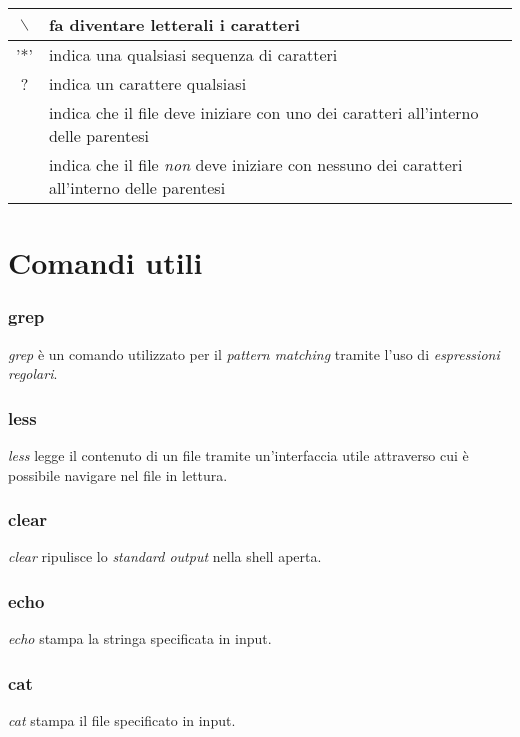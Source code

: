 \begin{center}
	\begin{tabular}{|c|p{4cm}|}
	\hline
		$ \backslash $	& fa diventare letterali i caratteri \\ \hline
		'*'				& indica una qualsiasi sequenza di caratteri \\ \hline
		? 			& indica un carattere qualsiasi \\ \hline
		[]			& indica che il file deve iniziare con uno dei caratteri all'interno delle parentesi \\ \hline
		[!]			& indica che il file \textit{non} deve iniziare con nessuno dei caratteri all'interno delle parentesi \\
	\hline
	\end{tabular}
\end{center}

\section{Comandi utili}
\subsubsection{grep}
\textit{grep} è un comando utilizzato per il \textit{pattern matching} tramite l'uso di \textit{espressioni regolari}.

\subsubsection{less}
\textit{less} legge il contenuto di un file tramite un'interfaccia utile attraverso cui è possibile navigare nel file in lettura.

\subsubsection{clear}
\textit{clear} ripulisce lo \textit{standard output} nella shell aperta.

\subsubsection{echo}
\textit{echo} stampa la stringa specificata in input.

\subsubsection{cat}
\textit{cat} stampa il file specificato in input.

